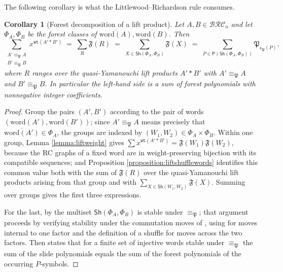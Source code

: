 \documentclass{amsart}
\newtheorem{corollary}[lemma]{Corollary}
\theoremstyle{definition}
\theoremstyle{remark}
\numberwithin{equation}{subsection}
\newcommand{\wtt}{\mathtt{wt}}
\newcommand{\BRC}{\mathcal{BRC}}
\newcommand{\code}{\mathfrak{c}}
\newcommand{\forest}{\mathfrak{P}}
\begin{document}
The following corollary is what the Littlewood--Richardson rule consumes.

\begin{corollary}[Forest decomposition of a lift product]\label{corollary:liftforestdecomp}
Let $A,B\in\BRC_n$ and let $\Phi_A,\Phi_B$ be the forest classes of $\overline{\mathrm{word}(A)},\overline{\mathrm{word}(B)}$. Then
$$\sum_{\substack{A'\equiv_\forest A\\ B'\equiv_\forest B}}x^{\wtt(A'*B')}\;=\;\sum_{R}\mathfrak{F}(R)\;=\;\sum_{X\in\mathsf{Sh}(\Phi_A,\Phi_B)}\mathfrak{F}(X)\;=\;\sum_{P\in\mathsf{P}(\mathsf{Sh}(\Phi_A,\Phi_B))}\forest_{\code_\forest(P)},$$
where $R$ ranges over the quasi-Yamanouchi lift products $A'*B'$ with $A'\equiv_\forest A$ and $B'\equiv_\forest B$. In particular the left-hand side is a sum of forest polynomials with nonnegative integer coefficients.
\end{corollary}
\begin{proof}
Group the pairs $(A',B')$ according to the pair of words $(\mathrm{word}(A'),\mathrm{word}(B'))$; since $A'\equiv_\forest A$ means precisely that $\overline{\mathrm{word}(A')}\in\Phi_A$, the groups are indexed by $(W_1,W_2)\in\Phi_A\times\Phi_B$. Within one group, Lemma \ref{lemma:liftweight} gives $\sum x^{\wtt(A'*B')}=\mathfrak{F}(W_1)\mathfrak{F}(W_2)$, because the RC graphs of a fixed word are in weight-preserving bijection with its compatible sequences; and Proposition \ref{proposition:liftshufflewords} identifies this common value both with the sum of $\mathfrak{F}(R)$ over the quasi-Yamanouchi lift products arising from that group and with $\sum_{X\in\mathsf{Sh}(W_1,W_2)}\mathfrak{F}(X)$. Summing over groups gives the first three expressions.

For the last, by \cite[Theorem~6.3]{nadeau2024forest} the multiset $\mathsf{Sh}(\Phi_A,\Phi_B)$ is stable under $\equiv_\forest$; that argument proceeds by verifying stability under the commutation moves of \cite[Proposition~5.8]{nadeau2024forest}, using \cite[Lemma~5.9]{nadeau2024forest} for moves internal to one factor and the definition of a shuffle for moves across the two factors. Then \cite[Proposition~5.10]{nadeau2024forest} states that for a finite set of injective words stable under $\equiv_\forest$ the sum of the slide polynomials equals the sum of the forest polynomials of the occurring $P$-symbols.
\end{proof}
\end{document}
